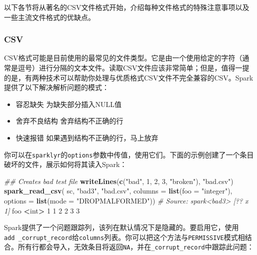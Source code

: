\documentclass[
]{article}
\newenvironment{Shaded}{\begin{snugshade}}{\end{snugshade}}
\newcommand{\CommentTok}[1]{\textcolor[rgb]{0.56,0.35,0.01}{\textit{#1}}}
\newcommand{\DataTypeTok}[1]{\textcolor[rgb]{0.13,0.29,0.53}{#1}}
\newcommand{\DecValTok}[1]{\textcolor[rgb]{0.00,0.00,0.81}{#1}}
\newcommand{\KeywordTok}[1]{\textcolor[rgb]{0.13,0.29,0.53}{\textbf{#1}}}
\newcommand{\NormalTok}[1]{#1}
\newcommand{\OperatorTok}[1]{\textcolor[rgb]{0.81,0.36,0.00}{\textbf{#1}}}
\newcommand{\StringTok}[1]{\textcolor[rgb]{0.31,0.60,0.02}{#1}}
\providecommand{\tightlist}{%
  \setlength{\itemsep}{0pt}\setlength{\parskip}{0pt}}
\begin{document}
以下各节将从著名的CSV文件格式开始，介绍每种文件格式的特殊注意事项以及一些主流文件格式的优缺点。

\hypertarget{csv}{%
\subsubsection{CSV}\label{csv}}

CSV格式可能是目前使用的最常见的文件类型。它是由一个使用给定的字符（通常是逗号）进行分隔的文本文件。读取CSV文件应该非常简单；但是，值得一提的是，有两种技术可以帮助你处理与优质格式CSV文件不完全兼容的CSV。Spark提供了以下解决解析问题的模式：

\begin{itemize}
\tightlist
\item
  容忍缺失 为缺失部分插入NULL值
\item
  舍弃不良结构 舍弃结构不正确的行
\item
  快速报错 如果遇到结构不正确的行，马上放弃
\end{itemize}

你可以在\texttt{sparklyr}的\texttt{options}参数中传值，使用它们。下面的示例创建了一个条目破坏的文件，展示如何将其读入Spark：

\begin{Shaded}
\begin{Highlighting}[]
\CommentTok{## Creates bad test file}
\KeywordTok{writeLines}\NormalTok{(}\KeywordTok{c}\NormalTok{(}\StringTok{"bad"}\NormalTok{, }\DecValTok{1}\NormalTok{, }\DecValTok{2}\NormalTok{, }\DecValTok{3}\NormalTok{, }\StringTok{"broken"}\NormalTok{), }\StringTok{"bad.csv"}\NormalTok{)}
\KeywordTok{spark_read_csv}\NormalTok{(}
\NormalTok{sc,}
\StringTok{"bad3"}\NormalTok{,}
\StringTok{"bad.csv"}\NormalTok{,}
\DataTypeTok{columns =} \KeywordTok{list}\NormalTok{(}\DataTypeTok{foo =} \StringTok{"integer"}\NormalTok{),}
\DataTypeTok{options =} \KeywordTok{list}\NormalTok{(}\DataTypeTok{mode =} \StringTok{"DROPMALFORMED"}\NormalTok{))}
\CommentTok{# Source: spark<bad3> [?? x 1]}
\NormalTok{ foo}
 \OperatorTok{<}\NormalTok{int}\OperatorTok{>}
\DecValTok{1} \DecValTok{1}
\DecValTok{2} \DecValTok{2}
\DecValTok{3} \DecValTok{3}
\end{Highlighting}
\end{Shaded}

Spark提供了一个问题跟踪列，该列在默认情况下是隐藏的。要启用它，使用\texttt{add\ \_corrupt\_record}给\texttt{columns}列表。你可以把这个方法与\texttt{PERMISSIVE}模式相结合。所有行都会导入，无效条目将返回\texttt{NA}，并在\texttt{\_corrupt\_record}中跟踪此问题：
\end{document}
